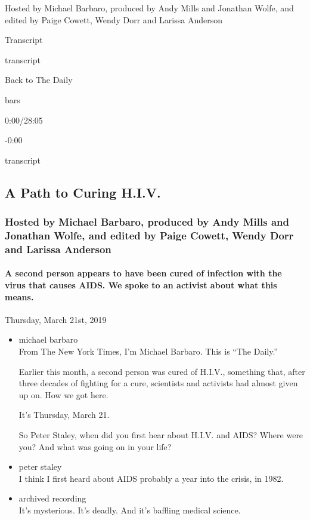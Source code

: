 Hosted by Michael Barbaro, produced by Andy Mills and Jonathan Wolfe,
and edited by Paige Cowett, Wendy Dorr and Larissa Anderson

Transcript

transcript

Back to The Daily

bars

0:00/28:05

-0:00

transcript

\hypertarget{a-path-to-curing-hiv-2}{%
\subsection{A Path to Curing H.I.V.}\label{a-path-to-curing-hiv-2}}

\hypertarget{hosted-by-michael-barbaro-produced-by-andy-mills-and-jonathan-wolfe-and-edited-by-paige-cowett-wendy-dorr-and-larissa-anderson-1}{%
\subsubsection{Hosted by Michael Barbaro, produced by Andy Mills and
Jonathan Wolfe, and edited by Paige Cowett, Wendy Dorr and Larissa
Anderson}\label{hosted-by-michael-barbaro-produced-by-andy-mills-and-jonathan-wolfe-and-edited-by-paige-cowett-wendy-dorr-and-larissa-anderson-1}}

\hypertarget{a-second-person-appears-to-have-been-cured-of-infection-with-the-virus-that-causes-aids-we-spoke-to-an-activist-about-what-this-means-2}{%
\paragraph{A second person appears to have been cured of infection with
the virus that causes AIDS. We spoke to an activist about what this
means.}\label{a-second-person-appears-to-have-been-cured-of-infection-with-the-virus-that-causes-aids-we-spoke-to-an-activist-about-what-this-means-2}}

Thursday, March 21st, 2019

\begin{itemize}
\item
  michael barbaro\\
  From The New York Times, I'm Michael Barbaro. This is ``The Daily.''

  Earlier this month, a second person was cured of H.I.V., something
  that, after three decades of fighting for a cure, scientists and
  activists had almost given up on. How we got here.

  It's Thursday, March 21.

  So Peter Staley, when did you first hear about H.I.V. and AIDS? Where
  were you? And what was going on in your life?
\item
  peter staley\\
  I think I first heard about AIDS probably a year into the crisis, in
  1982.
\item
  archived recording\\
  It's mysterious. It's deadly. And it's baffling medical science.
\end{itemize}

